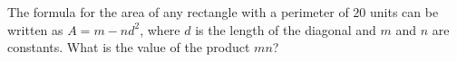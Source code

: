 The formula for the area of any rectangle with a perimeter of $20$ units can be written as $A=m-nd^2$, where $d$ is the length of the diagonal and $m$ and $n$ are constants. What is the value of the product $mn$?
